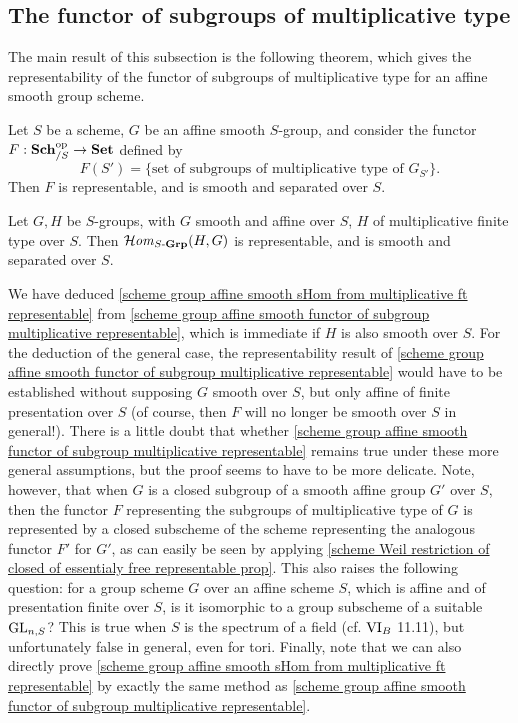 \subsection{The functor of subgroups of multiplicative type}
The main result of this subsection is the following theorem, which gives the representability of the functor of subgroups of multiplicative type for an affine smooth group scheme.

\begin{theorem}\label{scheme group affine smooth functor of subgroup multiplicative representable}
Let $S$ be a scheme, $G$ be an affine smooth $S$-group, and consider the functor $F:\mathbf{Sch}_{/S}^{\mathrm{op}}\to\mathbf{Set}$ defined by 
\[F(S')=\{\text{set of subgroups of multiplicative type of $G_{S'}$}\}.\]
Then $F$ is representable, and is smooth and separated over $S$.
\end{theorem}

\begin{corollary}\label{scheme group affine smooth sHom from multiplicative ft representable}
Let $G,H$ be $S$-groups, with $G$ smooth and affine over $S$, $H$ of multiplicative finite type over $S$. Then $\operatorname{\mathcal{H}\hspace*{-0.4pt}\textit{om}\hspace{0.5pt}}_{S\textup{-}\mathbf{Grp}}(H,G)$ is representable, and is smooth and separated over $S$.
\end{corollary}

\begin{remark}
We have deduced \cref{scheme group affine smooth sHom from multiplicative ft representable} from \cref{scheme group affine smooth functor of subgroup multiplicative representable}, which is immediate if $H$ is also smooth over $S$. For the deduction of the general case, the representability result of \cref{scheme group affine smooth functor of subgroup multiplicative representable} would have to be established without supposing $G$ smooth over $S$, but only affine of finite presentation over $S$ (of course, then $F$ will no longer be smooth over $S$ in general!). There is a little doubt that whether \cref{scheme group affine smooth functor of subgroup multiplicative representable} remains true under these more general assumptions, but the proof seems to have to be more delicate. Note, however, that when $G$ is a closed subgroup of a smooth affine group $G'$ over $S$, then the functor $F$ representing the subgroups of multiplicative type of $G$ is represented by a closed subscheme of the scheme representing the analogous functor $F'$ for $G'$, as can easily be seen by applying \cref{scheme Weil restriction of closed of essentialy free representable prop}. This also raises the following question: for a group scheme $G$ over an affine scheme $S$, which is affine and of presentation finite over $S$, is it isomorphic to a group subscheme of a suitable $\mathrm{GL}_{n,S}$? This is true when $S$ is the spectrum of a field (cf. \cite{SGA3-1} $\Rmnum{6}_B$ 11.11), but unfortunately false in general, even for tori. Finally, note that we can also directly prove \cref{scheme group affine smooth sHom from multiplicative ft representable} by exactly the same method as \cref{scheme group affine smooth functor of subgroup multiplicative representable}.
\end{remark}


